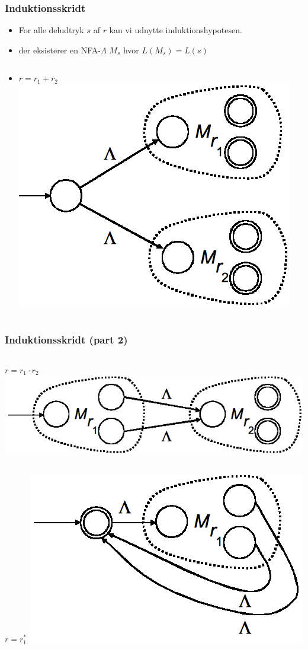 \begin{frame}
\frametitle{Induktionsskridt}
\begin{itemize}[<+->]
\item For alle deludtryk $s$ af $r$ kan vi udnytte induktionshypotesen.
\item der eksisterer en NFA-$\Lambda$ $M_s$ hvor $L(M_s)=L(s)$
\item 
\begin{columns}
\column{5cm}$r=r_1+r_2$ \pause
\column{5cm}\includegraphics[scale=0.4]{images/2_seminar_kleene_1_add}
\end{columns}
\end{itemize}
\end{frame}
\begin{frame}
\frametitle{Induktionsskridt (part 2)}
\begin{columns}
\column{5cm}$r=r_1\cdot r_2$ \pause
\column{5cm}\includegraphics[scale=0.4]{images/2_seminar_kleene_1_times}
\end{columns} \pause
\begin{columns}
\column{5cm}$r=r_1^*$ \pause
\column{5cm}\includegraphics[scale=0.4]{images/2_seminar_kleene_1_star}
\end{columns}
\end{frame}

